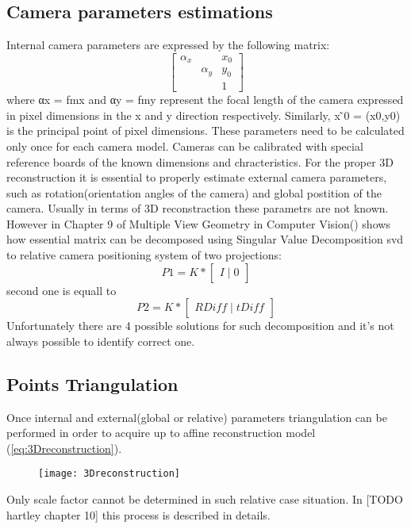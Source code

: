 \subsection{Camera parameters estimations}
Internal camera parameters are expressed by the following matrix:
\begin{equation}
\begin{bmatrix}
\alpha _{x} &  & x_{0} \\ 
 & \alpha _{y} & y_{0}\\ 
 &  & 1
\end{bmatrix}
\end{equation}
where αx = fmx and αy = fmy represent the focal length of the camera expressed in pixel dimensions in the x and y direction respectively. 
Similarly, x ̃0 = (x0,y0) is the principal point of pixel dimensions. These parameters need to be calculated only once for each camera model. Cameras can be calibrated with special reference boards of the known dimensions and chracteristics.
For the proper 3D reconstruction it is essential to properly estimate external camera parameters, such as rotation(orientation angles of the camera) and global postition of the camera. Usually in terms of 3D reconstraction these parametrs are not known. However in Chapter 9 of Multiple View Geometry in Computer Vision(\cite{HartleyMultipleView}) shows how essential matrix can be decomposed using Singular Value Decomposition \gls{svd} to relative camera positioning system of two projections:
\begin{equation}
 P1 = K * \begin{bmatrix}I\mid 0\end{bmatrix}
\end{equation}
second one is equall to 
\begin{equation}
 P2 = K * \begin{bmatrix}RDiff\mid tDiff\end{bmatrix}
\end{equation}
Unfortunately there are 4 possible solutions for such decomposition and it's not always possible to identify correct one.
\subsection{Points Triangulation}
Once internal and external(global or relative) parameters triangulation can be performed in order to acquire up to affine reconstruction model (\ref{eq:3Dreconstruction}).
\begin{figure}[p]
    \centering
    \texttt{[image: 3Dreconstruction]}
    \caption{}
    \label{fig:3Dreconstruction}
\end{figure}
Only scale factor cannot be determined in such relative case situation. In [TODO hartley chapter 10] this process is described in details.
